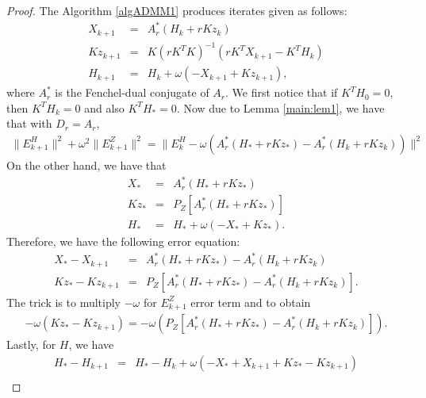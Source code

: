 \begin{proof} 
The Algorithm \ref{algADMM1} produces iterates given as follows: 
\begin{eqnarray*}
X_{k+1} &=& A_r^* (H_k + r K z_k) \\
Kz_{k+1} &=& K(rK^TK)^{-1} (rK^T X_{k+1} - K^TH_k) \\ 
H_{k+1} &=& H_k + \omega (-X_{k+1} + Kz_{k+1} ), 
\end{eqnarray*}
where $A_r^*$ is the Fenchel-dual conjugate of $A_r$. We first notice that if $K^TH_0 = 0$, then $K^TH_k = 0$ and also $K^TH_* = 0$. Now due to Lemma \ref{main:lem1}, we have that with $D_r = A_r$,  
\begin{eqnarray*}
\|E_{k+1}^H\|^2 + \omega^2 \|E_{k+1}^Z\|^2 = \|E_k^H - \omega (A_r^{*} (H_* + r K z_*) - A_r^{*} (H_k + r K z_k))\|^2 %
\end{eqnarray*}
On the other hand, we have that 
\begin{eqnarray*}
X_{*} &=& A_r^{*} (H_* + r K z_*) \\
Kz_{*} &=& P_Z [A_r^{*}(H_* + rK z_*)] \\ 
H_{*} &=& H_* + \omega (-X_{*} + K z_{*}). 
\end{eqnarray*}
Therefore, we have the following error equation: 
\begin{eqnarray*}
X_{*} - X_{k+1} &=& A_r^{*} (H_* + r K z_*) - A_r^{*} (H_k + r K z_k) \\
Kz_{*} - Kz_{k+1} &=& P_Z [ A_r^{*} (H_* + rK z_*) - A_r^{*} (H_k + rK z_k) ]. 
\end{eqnarray*}
The trick is to multiply $-\omega$ for $E_{k+1}^Z$ error term and to obtain 
\begin{eqnarray*}
-\omega \left ( Kz_{*} - Kz_{k+1} \right ) = -\omega \left ( P_Z [ A_r^{*} (H_* + rK z_*) - A_r^{*} (H_k + rK z_k) ] \right ). 
\end{eqnarray*}
Lastly, for $H$, we have 
\begin{eqnarray*}
H_{*} - H_{k+1} &=& H_* - H_k + \omega ( -X_* + X_{k+1} + Kz_* - K z_{k+1} ) \\ 

\end{eqnarray*}
\end{proof}

